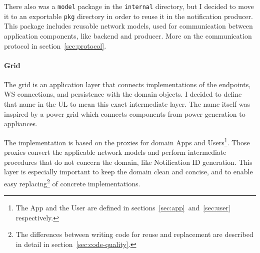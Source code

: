 There also was a \texttt{model} package
in the \texttt{internal} directory,
but I decided to move it to an exportable \texttt{pkg} directory
in order to reuse it in the notification producer.
This package includes reusable network models,
used for communication between application components,
like backend and producer.
More on the communication protocol in section~\ref{sec:protocol}.

\paragraph*{Grid}\label{sec:grid}

The grid is an application layer
that connects implementations of
the endpoints, \ac{WS} connections, and persistence
with the domain objects.
I decided to define that name in the \ac{UL}
to mean this exact intermediate layer.
The name itself was inspired by a power grid
which connects components
from power generation
to appliances.

The implementation is based on the proxies
for domain Apps and Users\footnote{
      The App and the User are defined in
      sections~\ref{sec:app}~and~\ref{sec:user}
      respectively.
}.
Those proxies convert the applicable network models
and perform intermediate procedures
that do not concern the domain,
like Notification \ac{ID} generation.
This layer is especially important
to keep the domain clean and concise,
and to enable easy replacing\footnote{
      The differences between writing code
      for reuse and replacement are described in detail
      in section~\ref{sec:code-quality}.
}
of concrete implementations.

